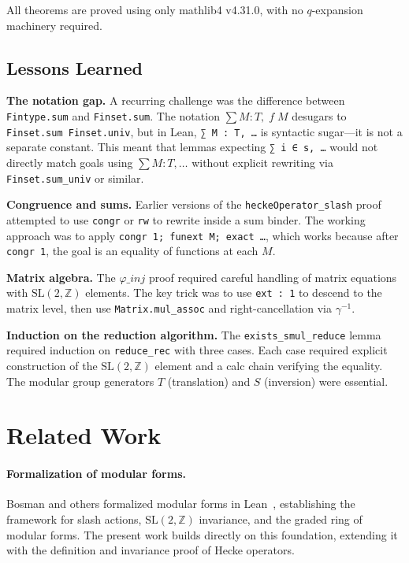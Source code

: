 \documentclass[11pt]{article}
\theoremstyle{plain}
\theoremstyle{definition}
\theoremstyle{remark}
\begin{document}
All theorems are proved using only mathlib4 v4.31.0, with no $q$-expansion machinery required.

\subsection{Lessons Learned}

\textbf{The notation gap.} A recurring challenge was the difference between \texttt{Fintype.sum} and \texttt{Finset.sum}. The notation $\sum M:T,\;f\;M$ desugars to \texttt{Finset.sum Finset.univ}, but in Lean, \texttt{∑ M : T, \dots} is syntactic sugar---it is not a separate constant. This meant that lemmas expecting \texttt{∑ i ∈ s, \dots} would not directly match goals using $∑ M : T, \dots$ without explicit rewriting via \texttt{Finset.sum\_univ} or similar.

\textbf{Congruence and sums.} Earlier versions of the \texttt{heckeOperator\_slash} proof attempted to use \texttt{congr} or \texttt{rw} to rewrite inside a sum binder. The working approach was to apply \texttt{congr 1; funext M; exact \dots}, which works because after \texttt{congr 1}, the goal is an equality of functions at each $M$.

\textbf{Matrix algebra.} The $\varphi\_inj$ proof required careful handling of matrix equations with $\mathrm{SL}(2,\mathbb{Z})$ elements. The key trick was to use \texttt{ext : 1} to descend to the matrix level, then use \texttt{Matrix.mul\_assoc} and right-cancellation via $\gamma^{-1}$.

\textbf{Induction on the reduction algorithm.} The \texttt{exists\_smul\_reduce} lemma required induction on \texttt{reduce\_rec} with three cases. Each case required explicit construction of the $\mathrm{SL}(2,\mathbb{Z})$ element and a calc chain verifying the equality. The modular group generators $T$ (translation) and $S$ (inversion) were essential.

\section{Related Work}
\label{sec:related}

\paragraph{Formalization of modular forms.}
Bosman and others formalized modular forms in Lean~\cite{bosman2024modular}, establishing the framework for slash actions, $\mathrm{SL}(2,\mathbb{Z})$ invariance, and the graded ring of modular forms.
The present work builds directly on this foundation, extending it with the definition and invariance proof of Hecke operators.
\end{document}
